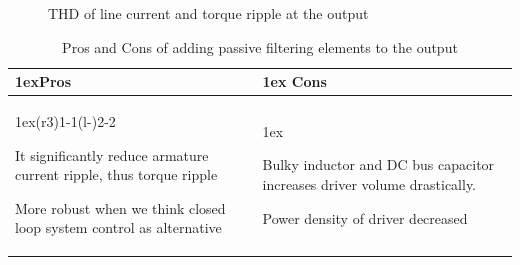 \documentclass[fleqn, a4paper]{report}
\begin{document}
\begin{figure}[H]%
    \centering
    \qquad
    \caption{THD of line current and torque ripple at the output}%
    \label{fig:example}%
\end{figure}
\begin{table}[H]
\begin{tabularx}{\linewidth}{>{\parskip1ex}X@{\kern4\tabcolsep}>{\parskip1ex}X}
\toprule
\hfil\bfseries Pros
&
\hfil\bfseries Cons
\\\cmidrule(r{3\tabcolsep}){1-1}\cmidrule(l{-\tabcolsep}){2-2}

It significantly reduce armature current ripple, thus torque ripple\par

More robust when we think closed loop system control as alternative\par

&

Bulky inductor and DC bus capacitor increases driver volume drastically. \par
Power density of driver decreased \par

\\\bottomrule
\end{tabularx}
\caption{Pros and Cons of adding passive filtering elements to the output}
\end{table}
\end{document}
